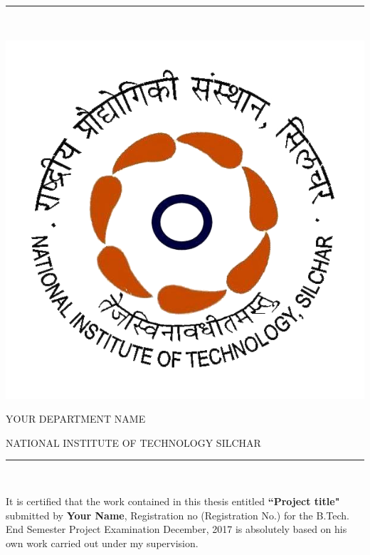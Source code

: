 \rule{150mm}{2pt}\\
\begin{minipage}[b]{0.1\linewidth}
\includegraphics[height=4\baselineskip]{Frontmatter/nit} %
\end{minipage}
\begin{minipage}[b]{0.9\linewidth}
\centerline{}
\centerline{}
\centerline{YOUR DEPARTMENT NAME}
\centerline{NATIONAL INSTITUTE OF TECHNOLOGY SILCHAR}
\centerline{}
\end{minipage}
\rule{150mm}{2pt}\\

\thispagestyle{empty}

It is certified that the work contained in this thesis entitled \textbf{``Project title"} submitted by \textbf{Your Name}, Registration no (Registration No.) for the B.Tech. End Semester Project Examination December, 2017 is absolutely based on his own work carried out under my supervision.


\vspace{1.5cm}



